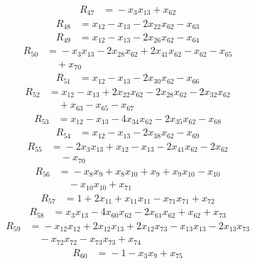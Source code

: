\begin{align*}
R_{47}&={}-x_{3}x_{13} +x_{62}
\end{align*}
\begin{align*}
R_{48}&={}x_{12} -x_{13} -2x_{22}x_{62} -x_{63}
\end{align*}
\begin{align*}
R_{49}&={}x_{12} -x_{13} -2x_{26}x_{62} -x_{64}
\end{align*}
\begin{align*}
R_{50}&={}-x_{3}x_{13} -2x_{28}x_{62} +2x_{41}x_{62} -x_{62} -x_{65}\\
&\quad{}+x_{70}
\end{align*}
\begin{align*}
R_{51}&={}x_{12} -x_{13} -2x_{30}x_{62} -x_{66}
\end{align*}
\begin{align*}
R_{52}&={}x_{12} -x_{13} +2x_{22}x_{62} -2x_{28}x_{62} -2x_{32}x_{62}\\
&\quad{}+x_{63} -x_{65} -x_{67}
\end{align*}
\begin{align*}
R_{53}&={}x_{12} -x_{13} -4x_{34}x_{62} -2x_{35}x_{62} -x_{68}
\end{align*}
\begin{align*}
R_{54}&={}x_{12} -x_{13} -2x_{38}x_{62} -x_{69}
\end{align*}
\begin{align*}
R_{55}&={}-2x_{3}x_{13} +x_{12} -x_{13} -2x_{41}x_{62} -2x_{62}\\
&\quad{}-x_{70}
\end{align*}
\begin{align*}
R_{56}&={}-x_{8}x_{9} +x_{8}x_{10} +x_{9} +x_{9}x_{10} -x_{10}\\
&\quad{}-x_{10}x_{10} +x_{71}
\end{align*}
\begin{align*}
R_{57}&={}1 +2x_{11} +x_{11}x_{11} -x_{71}x_{71} +x_{72}
\end{align*}
\begin{align*}
R_{58}&={}x_{3}x_{13} -4x_{60}x_{62} -2x_{61}x_{62} +x_{62} +x_{73}
\end{align*}
\begin{align*}
R_{59}&={}-x_{12}x_{12} +2x_{12}x_{13} +2x_{12}x_{73} -x_{13}x_{13} -2x_{13}x_{73}\\
&\quad{}-x_{72}x_{72} -x_{73}x_{73} +x_{74}
\end{align*}
\begin{align*}
R_{60}&={}-1 -x_{3}x_{9} +x_{75}
\end{align*}

